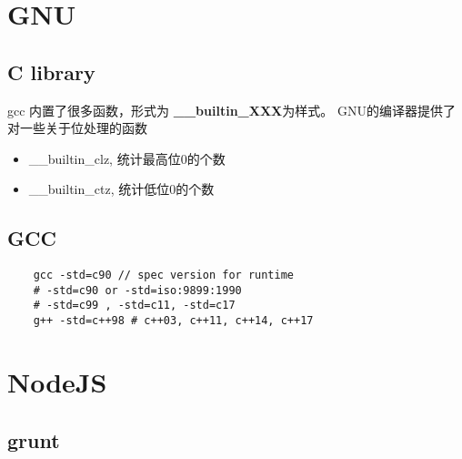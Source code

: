 \chapter{GNU}

\section{C library}
gcc 内置了很多函数，形式为 \textbf{ \_\_builtin\_XXX}为样式。
GNU的编译器提供了对一些关于位处理的函数
\begin{itemize}
    \item { \_\_builtin\_clz, 统计最高位0的个数 }
    \item { \_\_builtin\_ctz, 统计低位0的个数}
\end{itemize}

\section{GCC}

\begin{lstlisting}
    gcc -std=c90 // spec version for runtime
    # -std=c90 or -std=iso:9899:1990
    # -std=c99 , -std=c11, -std=c17
    g++ -std=c++98 # c++03, c++11, c++14, c++17
\end{lstlisting}

\chapter{NodeJS}

\section{grunt}

